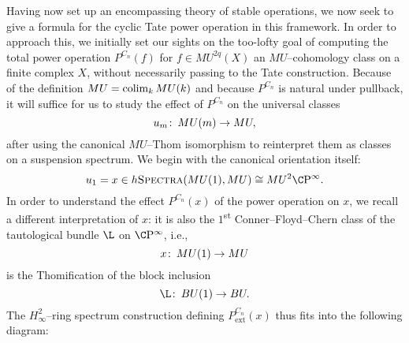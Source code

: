 Having now set up an encompassing theory of stable operations, we now seek to give a formula for the cyclic Tate power operation in this framework.  In order to approach this, we initially set our sights on the too-lofty goal of computing the total power operation \(P^{C_n}(f)\) for \(f \in MU^{2q}(X)\) an \(MU\)--cohomology class on a finite complex \(X\), without necessarily passing to the Tate construction.  Because of the definition \(MU = \operatorname*{colim}_k MU(k)\) and because \(P^{C_n}\) is natural under pullback, it will suffice for us to study the effect of \(P^{C_n}\) on the universal classes \[u_m\colon\thinspace MU(m) \to MU,\] after using the canonical \(MU\)--Thom isomorphism to reinterpret them as classes on a suspension spectrum.  We begin with the canonical orientation itself: \[u_1 = x \in h\CatOf{Spectra}(MU(1), MU) \cong MU^2 \CP^\infty.\]  In order to understand the effect \(P^{C_n}(x)\) of the power operation on \(x\), we recall a different interpretation of \(x\): it is also the \(1\)\textsuperscript{st} Conner--Floyd--Chern class of the tautological bundle \(\L\) on \(\CP^\infty\), i.e., \[x\colon\thinspace MU(1) \to MU\] is the Thomification of the block inclusion \[\L\co BU(1) \to BU.\]  The \(H_\infty^2\)--ring spectrum construction defining \(P^{C_n}_{\mathrm{ext}}(x)\) thus fits into the following diagram:
\begin{center}
\end{center}
